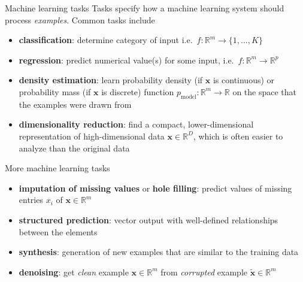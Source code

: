 \documentclass[dvipsnames]{beamer}
\def\ie{i.e.\ }
\begin{document}
		\begin{frame}{Machine learning tasks}
Tasks specify how a machine learning system should process \emph{examples}. Common tasks include \pause


\begin{itemize}
\item \textbf{classification}: determine category of input \ie $f: \mathbb{R}^m \rightarrow \{1, ..., K\}$ \pause

\item \textbf{regression}: predict numerical value(s) for some input, \ie  $f: \mathbb{R}^m \rightarrow \mathbb{R}^p$ \pause

\item \textbf{density estimation}: learn probability density (if $\mathbf{x}$ is continuous) or probability mass (if $\mathbf{x}$ is discrete) function $p_{\text{model}}: \mathbb{R}^m \rightarrow \mathbb{R}$ on the space that the examples were drawn from \pause

\item \textbf{dimensionality reduction}:  find a compact, lower-dimensional representation of high-dimensional data $\mathbf{x} \in \mathbb{R}^D$, which is often easier to analyze than the original data
\end{itemize}

\end{frame}

		\begin{frame}{More machine learning tasks}
\begin{itemize}
\item \textbf{imputation of missing values} or \textbf{hole filling}: predict values of missing entries $x_i$ of $\mathbf{x} \in \mathbb{R}^m$ \pause

\item \textbf{structured prediction}: vector output with well-defined relationships between the elements \pause

\item \textbf{synthesis}: generation of new examples that are similar to the training data \pause

\item \textbf{denoising}: get \emph{clean} example $\mathbf{x} \in \mathbb{R}^m$ from \emph{corrupted} example $\tilde{\mathbf{x}} \in \mathbb{R}^m$ %
\end{itemize}
\end{frame}
		
\end{document}
